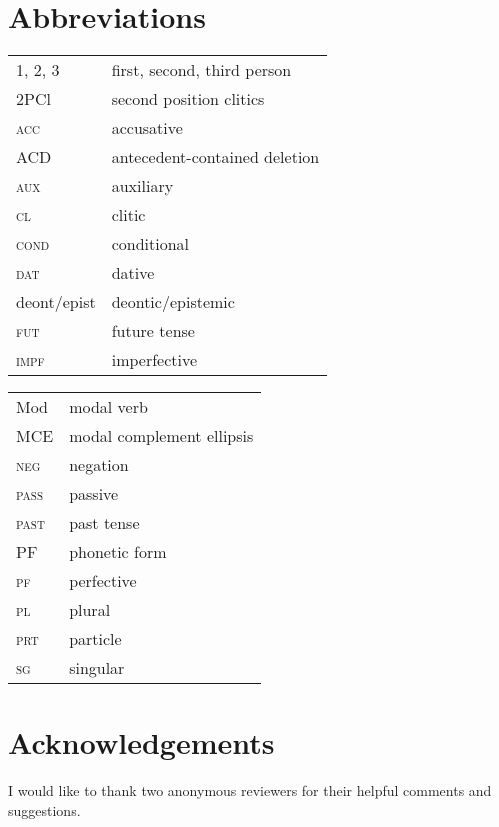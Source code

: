 \documentclass[output=paper,colorlinks,citecolor=brown,]{langsci/langscibook}
\begin{document}
\section*{Abbreviations}
\begin{tabularx}{.58\textwidth}{@{}lX@{}}
	1, 2, 3 & first, second, third person\\
	2P{Cl}&{second position} clitics\\
	\textsc{acc} & {accusative}\\
	{ACD}&antecedent-contained deletion\\
	\textsc{aux} & auxiliary\\
	\textsc{cl} & {clitic}\\
    \textsc{cond}&conditional\\
	\textsc{dat} & {dative}\\
    {deont}/{epist}& {deontic}/{epistemic}\\
    \textsc{fut}&future {tense}\\
	\textsc{impf}&{imperfective}\\
\end{tabularx}
\begin{tabularx}{.38\textwidth}{@{}lX@{}}
    {Mod} & {modal} {verb}\\
	{MCE}&{modal complement ellipsis}\\
	\textsc{neg} & {negation}\\
    \textsc{pass}&passive\\
	\textsc{past}&past {tense}\\
	{PF}& phonetic form\\
    \textsc{pf}&{perfective}\\
	\textsc{pl} & plural\\
	\textsc{prt} & particle\\
	\textsc{sg} & singular\\
\end{tabularx}

\section*{Acknowledgements}
I would like to thank two anonymous reviewers for their helpful comments and suggestions.

\sloppy
\printbibliography[heading=subbibliography,notkeyword=this]

\end{document}
